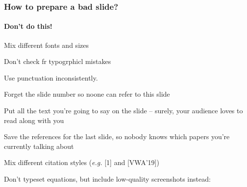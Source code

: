 \renewcommand{\colorslidenumberbg}{clrsred}
\renewcommand{\insertframenumber}{}
\begin{frame}

  \frametitle{How to prepare a bad slide?}
  \framesubtitle{\textcolor{clrsred}{\textbf{Don't do this!}}}
  \vspace{-0.6cm}
  \begin{lrsitemize}
    \setlength{\itemsep}{6pt}
    \item Mix {\selectfont different fonts} and {\scriptsize sizes}
    \item Don't check fr typogrphicl mistakes
    \item Use punctuation inconsistently.
    \item Forget the slide number so noone can refer to this slide
    \item Put all the text you're going to say on the slide -- surely, your audience loves to read along with you
    \item Save the references for the last slide, so nobody knows which papers you're currently talking about
    \item Mix different citation styles (\emph{e.g.} [1] and [VWA'19])
    \item Don't typeset equations, but include low-quality screenshots instead:
  \end{lrsitemize}
\end{frame}

